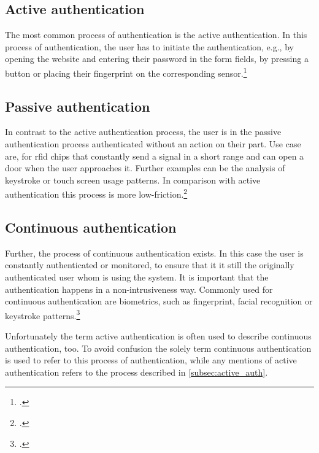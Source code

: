 \subsection{Active authentication}
\label{subsec:active_auth}

The most common process of authentication is the active authentication. In this process of authentication, the user has to initiate the authentication, e.g., by opening the website and entering their password in the form fields, by pressing a button or placing their fingerprint on the corresponding sensor.\footcites[See][185--186]{10.1007/978-3-319-05452-0_14}

\subsection{Passive authentication}

In contrast to the active authentication process, the user is in the passive authentication process authenticated without an action on their part. Use case are, for \gls{rfid} chips that constantly send a signal in a short range and can open a door when the user approaches it. Further examples can be the analysis of keystroke or touch screen usage patterns. In comparison with active authentication this process is more low-friction.\footcites[See][186]{10.1007/978-3-319-05452-0_14}[See][]{185306}

\subsection{Continuous authentication}

Further, the process of continuous authentication exists. In this case the user is constantly authenticated or monitored, to ensure that it it still the originally authenticated user whom is using the system. It is important that the authentication happens in a non-intrusiveness way. Commonly used for continuous authentication are biometrics, such as fingerprint, facial recognition or keystroke patterns.\footcites[See][236--238]{dasgupta2017multi}[See][]{7444124}

Unfortunately the term active authentication is often used to describe continuous authentication, too. To avoid confusion the solely term continuous authentication is used to refer to this process of authentication, while any mentions of active authentication refers to the process described in \autoref{subsec:active_auth}.

\newpage

